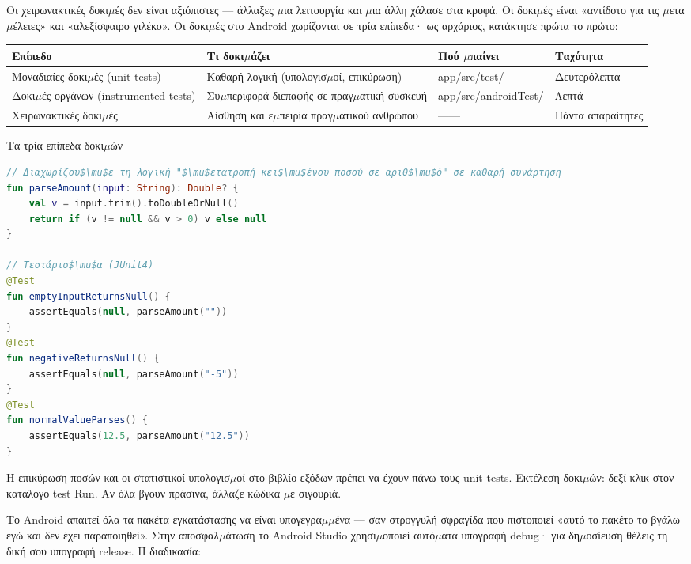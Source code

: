 
Οι χειρωνακτικές δοκι$\mu$ές δεν είναι αξιόπιστες — άλλαξες $\mu$ια λειτουργία και $\mu$ια άλλη χάλασε στα κρυφά. Οι δοκι$\mu$ές είναι «αντίδοτο για τις $\mu$ετα$\mu$έλειες» και «αλεξίσφαιρο γιλέκο». Οι δοκι$\mu$ές στο Android χωρίζονται σε τρία επίπεδα· ως αρχάριος, κατάκτησε πρώτα το πρώτο:

\begin{center}
\begin{tabularx}{\linewidth}{|X|X|X|X|}
\hline
\textbf{Επίπεδο} & \textbf{Τι δοκι$\mu$άζει} & \textbf{Πού $\mu$παίνει} & \textbf{Ταχύτητα} \tabularnewline
\hline
Μοναδιαίες δοκι$\mu$ές (unit tests) & Καθαρή λογική (υπολογισ$\mu$οί, επικύρωση) & app/src/test/ & Δευτερόλεπτα \tabularnewline
Δοκι$\mu$ές οργάνων (instrumented tests) & Συ$\mu$περιφορά διεπαφής σε πραγ$\mu$ατική συσκευή & app/src/androidTest/ & Λεπτά \tabularnewline
Χειρωνακτικές δοκι$\mu$ές & Αίσθηση και ε$\mu$πειρία πραγ$\mu$ατικού ανθρώπου & —— & Πάντα απαραίτητες \tabularnewline
\hline
\end{tabularx}
\end{center}

\begin{center}\small\color{gray}Τα τρία επίπεδα δοκι$\mu$ών\end{center}

\begin{lstlisting}[language=Kotlin]
// Διαχωρίζου$\mu$ε τη λογική "$\mu$ετατροπή κει$\mu$ένου ποσού σε αριθ$\mu$ό" σε καθαρή συνάρτηση
fun parseAmount(input: String): Double? {
    val v = input.trim().toDoubleOrNull()
    return if (v != null && v > 0) v else null
}

// Τεστάρισ$\mu$α (JUnit4)
@Test
fun emptyInputReturnsNull() {
    assertEquals(null, parseAmount(""))
}
@Test
fun negativeReturnsNull() {
    assertEquals(null, parseAmount("-5"))
}
@Test
fun normalValueParses() {
    assertEquals(12.5, parseAmount("12.5"))
}
\end{lstlisting}

Η επικύρωση ποσών και οι στατιστικοί υπολογισ$\mu$οί στο βιβλίο εξόδων πρέπει να έχουν πάνω τους unit tests. Εκτέλεση δοκι$\mu$ών: δεξί κλικ στον κατάλογο test Run. Αν όλα βγουν πράσινα, άλλαζε κώδικα $\mu$ε σιγουριά.


Το Android απαιτεί όλα τα πακέτα εγκατάστασης να είναι υπογεγρα$\mu$$\mu$ένα — σαν στρογγυλή σφραγίδα που πιστοποιεί «αυτό το πακέτο το βγάλω εγώ και δεν έχει παραποιηθεί». Στην αποσφαλ$\mu$άτωση το Android Studio χρησι$\mu$οποιεί αυτό$\mu$ατα υπογραφή debug· για δη$\mu$οσίευση θέλεις τη δική σου υπογραφή release. Η διαδικασία:


